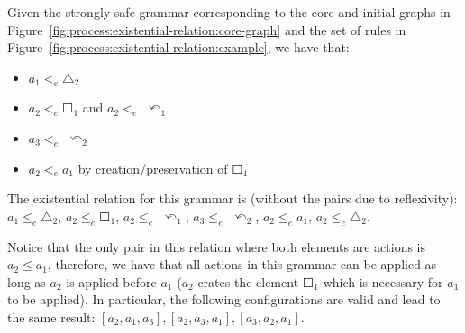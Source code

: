 \begin{example}\label{ex:process:existential-relation} Given the strongly safe grammar corresponding to the core and initial graphs in Figure~\ref{fig:process:existential-relation:core-graph} and the set of rules in Figure~\ref{fig:process:existential-relation:example}, we have that:

\begin{itemize}
  \item $a_1 <_e \triangle_2$
  \item $a_2 <_e \Square_1$ and $a_2 <_e$ $\curvearrowleft_1$
  \item $a_3 <_e$ $\curvearrowleft_2$
  \item $a_2 <_e a_1$ by creation/preservation of $\Square_1$
\end{itemize}

  The existential relation for this grammar is (without the pairs due to reflexivity): $a_1 \leq_e \triangle_2$, $a_2 \leq_e \Square_1$, $a_2 \leq_e$ $\curvearrowleft_1$, $a_3 \leq_e$ $\curvearrowleft_2$, $a_2 \leq_e a_1$, $a_2 \leq_e \triangle_2$.

  Notice that the only pair in this relation where both elements are actions is \mbox{$a_2 \leq a_1$}, therefore, we have that all actions in this grammar can be applied as long as $a_2$ is applied before $a_1$ ($a_2$ crates the element $\Square_1$ which is necessary for $a_1$ to be applied). In particular, the following configurations are valid and lead to the same result: $[a_2,a_1,a_3],[a_2,a_3,a_1],[a_3,a_2,a_1]$.


\end{example}
